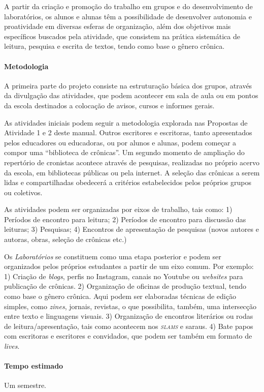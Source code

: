 \documentclass[11pt]{extarticle}
\begin{document}
{{A partir da criação e promoção do trabalho em grupos e do
desenvolvimento de laboratórios, os alunos e alunas têm a possibilidade
de desenvolver autonomia e proatividade em diversas esferas de
organização, além dos objetivos mais específicos buscados pela
atividade, que consistem na prática sistemática de leitura, pesquisa e
escrita de textos, tendo como base o gênero crônica.

\paragraph{Metodologia} A primeira parte do projeto consiste na
estruturação básica dos grupos, através da divulgação das atividades,
que podem acontecer em sala de aula ou em pontos da escola destinados a
colocação de avisos, cursos e informes gerais.

As atividades iniciais podem seguir a metodologia explorada nas
Propostas de Atividade 1 e 2 deste manual. Outros escritores e
escritoras, tanto apresentados pelos educadores ou educadoras, ou por
alunos e alunas, podem começar a compor uma ``biblioteca de crônicas''.
Um segundo momento de ampliação do repertório de cronistas acontece
através de pesquisas, realizadas no próprio acervo da escola, em
bibliotecas públicas ou pela internet. A seleção das crônicas a serem
lidas e compartilhadas obedecerá a critérios estabelecidos pelos
próprios grupos ou coletivos.

As atividades podem ser organizadas por eixos de trabalho, tais como: 1)
Períodos de encontro para leitura; 2) Períodos de encontro para
discussão das leituras; 3) Pesquisas; 4) Encontros de apresentação de
pesquisas (novos autores e autoras, obras, seleção de crônicas etc.)

Os \textit{Laboratórios} se constituem como uma etapa posterior e podem
ser organizados pelos próprios estudantes a partir de um eixo comum. Por
exemplo: 1) Criação de \emph{blogs}, perfis no Instagram, canais no
Youtube ou \emph{websites} para publicação de crônicas. 2) Organização
de oficinas de produção textual, tendo como base o gênero crônica. Aqui
podem ser elaboradas técnicas de edição simples, como \emph{zines},
jornais, revistas, o que possibilita, também, uma intersecção entre
texto e linguagens visuais. 3) Organização de encontros literários ou
rodas de leitura/apresentação, tais como acontecem nos \emph{\textsc{slams}} e
saraus. 4) Bate papos com escritoras e escritores e convidados, que podem
ser também em formato de \emph{lives}.

\paragraph{Tempo estimado} Um semestre.

}}
\end{document}
